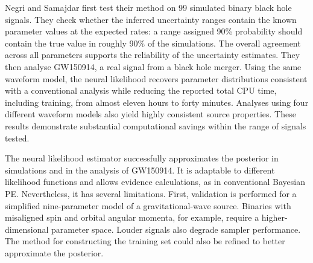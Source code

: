 \documentclass[11pt,a4paper]{article}
\begin{document}
Negri and Samajdar\cite{negri2025} first test their method on 99 simulated binary black hole signals. They check whether the inferred uncertainty ranges contain the known parameter values at the expected rates: a range assigned 90\% probability should contain the true value in roughly 90\% of the simulations. The overall agreement across all parameters supports the reliability of the uncertainty estimates. They then analyse GW150914, a real signal from a black hole merger. Using the same waveform model, the neural likelihood recovers parameter distributions consistent with a conventional analysis while reducing the reported total CPU time, including training, from almost eleven hours to forty minutes. Analyses using four different waveform models also yield highly consistent source properties. These results demonstrate substantial computational savings within the range of signals tested.


The neural likelihood estimator successfully approximates the posterior in simulations and in the analysis of GW150914. It is adaptable to different likelihood functions and allows evidence calculations, as in conventional Bayesian PE. Nevertheless, it has several limitations. First, validation is performed for a simplified nine-parameter model of a gravitational-wave source. Binaries with misaligned spin and orbital angular momenta, for example, require a higher-dimensional parameter space. Louder signals also degrade sampler performance. The method for constructing the training set could also be refined to better approximate the posterior.

\end{document}
